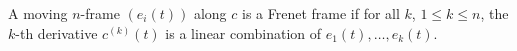 A moving $n$-frame $(e_i(t))$ along $c$ is a Frenet frame if for all $k$, $1 \leq k \leq n$, the $k$-th derivative $c^{(k)}(t)$ is a linear combination of $e_1(t), \ldots, e_k(t)$.